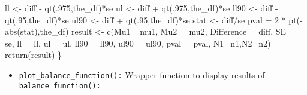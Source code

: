 \documentclass[
]{article}
\newenvironment{Shaded}{\begin{snugshade}}{\end{snugshade}}
\newcommand{\AttributeTok}[1]{\textcolor[rgb]{0.77,0.63,0.00}{#1}}
\newcommand{\DecValTok}[1]{\textcolor[rgb]{0.00,0.00,0.81}{#1}}
\newcommand{\FunctionTok}[1]{\textcolor[rgb]{0.00,0.00,0.00}{#1}}
\newcommand{\NormalTok}[1]{#1}
\newcommand{\OtherTok}[1]{\textcolor[rgb]{0.56,0.35,0.01}{#1}}
\newcommand{\SpecialCharTok}[1]{\textcolor[rgb]{0.00,0.00,0.00}{#1}}
\providecommand{\tightlist}{%
  \setlength{\itemsep}{0pt}\setlength{\parskip}{0pt}}
\begin{document}
\begin{Shaded}
\begin{Highlighting}[]
\NormalTok{  ll }\OtherTok{\textless{}{-}}\NormalTok{ diff }\SpecialCharTok{{-}} \FunctionTok{qt}\NormalTok{(.}\DecValTok{975}\NormalTok{,the\_df)}\SpecialCharTok{*}\NormalTok{se}
\NormalTok{  ul }\OtherTok{\textless{}{-}}\NormalTok{ diff }\SpecialCharTok{+} \FunctionTok{qt}\NormalTok{(.}\DecValTok{975}\NormalTok{,the\_df)}\SpecialCharTok{*}\NormalTok{se}
\NormalTok{  ll90 }\OtherTok{\textless{}{-}}\NormalTok{ diff }\SpecialCharTok{{-}} \FunctionTok{qt}\NormalTok{(.}\DecValTok{95}\NormalTok{,the\_df)}\SpecialCharTok{*}\NormalTok{se}
\NormalTok{  ul90 }\OtherTok{\textless{}{-}}\NormalTok{ diff }\SpecialCharTok{+} \FunctionTok{qt}\NormalTok{(.}\DecValTok{95}\NormalTok{,the\_df)}\SpecialCharTok{*}\NormalTok{se}
\NormalTok{  stat }\OtherTok{\textless{}{-}}\NormalTok{ diff}\SpecialCharTok{/}\NormalTok{se}
\NormalTok{  pval }\OtherTok{=} \DecValTok{2} \SpecialCharTok{*} \FunctionTok{pt}\NormalTok{(}\SpecialCharTok{{-}}\FunctionTok{abs}\NormalTok{(stat),the\_df)}
\NormalTok{  result }\OtherTok{\textless{}{-}} \FunctionTok{c}\NormalTok{(}\AttributeTok{Mu1=}\NormalTok{ mu1, }\AttributeTok{Mu2 =}\NormalTok{ mu2, }\AttributeTok{Difference =}\NormalTok{ diff, }\AttributeTok{SE =}\NormalTok{ se, }\AttributeTok{ll =}\NormalTok{ ll, }\AttributeTok{ul =}\NormalTok{ ul,}
              \AttributeTok{ll90 =}\NormalTok{ ll90, }\AttributeTok{ul90 =}\NormalTok{ ul90, }\AttributeTok{pval =}\NormalTok{ pval, }\AttributeTok{N1=}\NormalTok{n1,}\AttributeTok{N2=}\NormalTok{n2)}
  \FunctionTok{return}\NormalTok{(result)}
\NormalTok{\}}
\end{Highlighting}
\end{Shaded}

\begin{itemize}
\tightlist
\item
  \texttt{plot\_balance\_function():} Wrapper function to display
  results of \texttt{balance\_function():}
\end{itemize}
\end{document}
